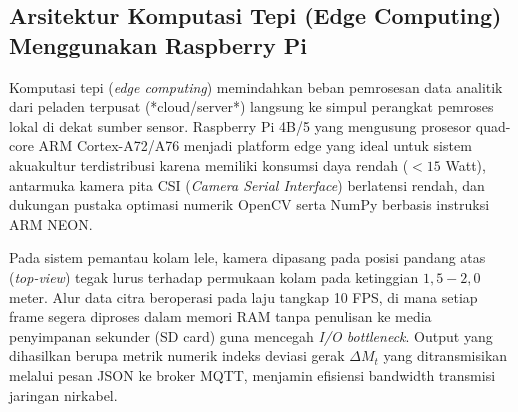 \subsection{Arsitektur Komputasi Tepi (Edge Computing) Menggunakan Raspberry Pi}
Komputasi tepi (\textit{edge computing}) memindahkan beban pemrosesan data analitik dari peladen terpusat (*cloud/server*) langsung ke simpul perangkat pemroses lokal di dekat sumber sensor. Raspberry Pi 4B/5 yang mengusung prosesor quad-core ARM Cortex-A72/A76 menjadi platform edge yang ideal untuk sistem akuakultur terdistribusi karena memiliki konsumsi daya rendah ($<15$ Watt), antarmuka kamera pita CSI (\textit{Camera Serial Interface}) berlatensi rendah, dan dukungan pustaka optimasi numerik OpenCV serta NumPy berbasis instruksi ARM NEON.

Pada sistem pemantau kolam lele, kamera dipasang pada posisi pandang atas (\textit{top-view}) tegak lurus terhadap permukaan kolam pada ketinggian $1,5 - 2,0$ meter. Alur data citra beroperasi pada laju tangkap 10 FPS, di mana setiap frame segera diproses dalam memori RAM tanpa penulisan ke media penyimpanan sekunder (SD card) guna mencegah \textit{I/O bottleneck}. Output yang dihasilkan berupa metrik numerik indeks deviasi gerak $\Delta M_t$ yang ditransmisikan melalui pesan JSON ke broker MQTT, menjamin efisiensi bandwidth transmisi jaringan nirkabel.
